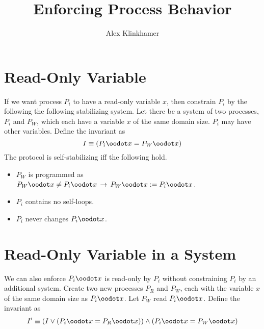 


\newcommand{\actxnto}{\,\to\,}


\title{Enforcing Process Behavior}
\author{Alex Klinkhamer}
\maketitle

\section{Read-Only Variable}
If we want process $P_i$ to have a read-only variable $x$, then constrain $P_i$ by the following the following stabilizing system.
Let there be a system of two processes, $P_i$ and $P_W$, which each have a variable $x$ of the same domain size.
$P_i$ may have other variables.
Define the invariant as
\[I \equiv (P_i\oodot x = P_W\oodot x)\]
The protocol is self-stabilizing iff the following hold.
\begin{itemize}
\item $P_W$ is programmed as $P_W\oodot x \ne P_i\oodot x \actxnto P_W\oodot x\defeq P_i\oodot x$.
\item $P_i$ contains no self-loops.
\item $P_i$ never changes $P_i\oodot x$.
\end{itemize}

\section{Read-Only Variable in a System}
We can also enforce $P_i\oodot x$ is read-only by $P_i$ without constraining $P_i$ by an additional system.
Create two new processes $P_R$ and $P_W$, each with the variable $x$ of the same domain size as $P_i\oodot x$.
Let $P_W$ read $P_i\oodot x$.
Define the invariant as
\[I'\equiv (I\vee (P_i\oodot x = P_R\oodot x)) \wedge (P_i\oodot x = P_W\oodot x)\]

